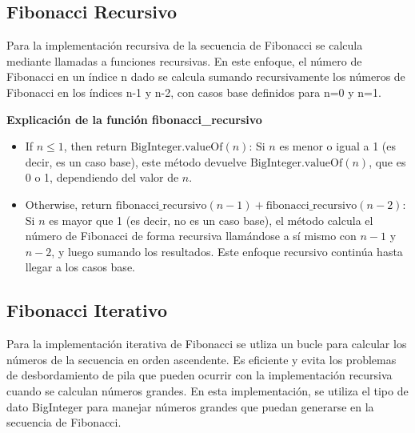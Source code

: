 \documentclass{article}
\begin{document}
        \subsection{Fibonacci Recursivo}
            Para la implementación recursiva de la secuencia de Fibonacci se calcula mediante llamadas a funciones recursivas. En este enfoque, el número de Fibonacci en un índice n dado se calcula sumando recursivamente los números de Fibonacci en los índices n-1 y n-2, con casos base definidos para n=0 y n=1.

            

            \textbf{Explicación de la función fibonacci\_recursivo}\par  
            \begin{itemize}
                \item If \(n \leq 1\), then return \(\text{BigInteger.valueOf}(n)\): Si \(n\) es menor o igual a 1 (es decir, es un caso base), este método devuelve \(\text{BigInteger.valueOf}(n)\), que es 0 o 1, dependiendo del valor de \(n\).
                \item Otherwise, return \(\text{fibonacci\_recursivo}(n - 1) + \text{fibonacci\_recursivo}(n - 2)\): Si \(n\) es mayor que 1 (es decir, no es un caso base), el método calcula el número de Fibonacci de forma recursiva llamándose a sí mismo con \(n - 1\) y \(n - 2\), y luego sumando los resultados. Este enfoque recursivo continúa hasta llegar a los casos base.
            \end{itemize}
        
        \subsection{Fibonacci Iterativo}
            Para la implementación iterativa de Fibonacci se utliza un bucle para calcular los números de la secuencia en orden ascendente. Es eficiente y evita los problemas de desbordamiento de pila que pueden ocurrir con la implementación recursiva cuando se calculan números grandes. En esta implementación, se utiliza el tipo de dato BigInteger para manejar números grandes que puedan generarse en la secuencia de Fibonacci.
            
            	         
            
\end{document}
